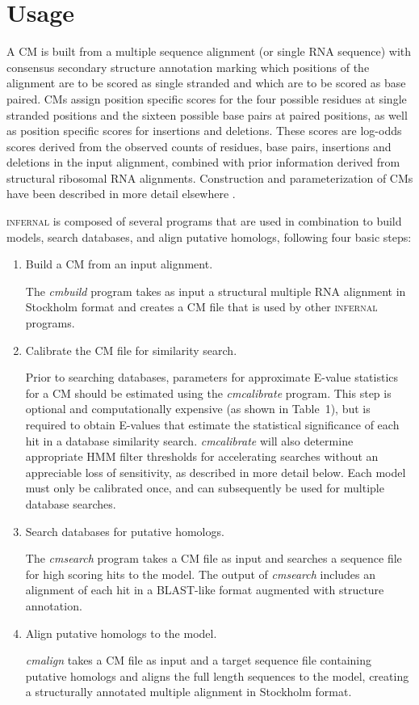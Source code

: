 
\section{Usage} 

A CM is built from a multiple sequence alignment (or single RNA
sequence) with consensus secondary structure annotation marking which
positions of the alignment are to be scored as single stranded and
which are to be scored as base paired. CMs assign position specific
scores for the four possible residues at single stranded positions and
the sixteen possible base pairs at paired positions, as well as
position specific scores for insertions and deletions. These scores
are log-odds scores derived from the observed counts of residues, base
pairs, insertions and deletions in the input alignment, combined with
prior information derived from structural ribosomal RNA
alignments. Construction and parameterization of CMs have been
described in more detail elsewhere
\citep{Eddy94,infguide03,Eddy02b,NawrockiEddy07}.

\textsc{infernal} is composed of several programs that are used in
combination to build models, search databases, and align putative
homologs, following four basic steps:

\begin{enumerate}
\item Build a CM from an input alignment.

The \emph{cmbuild} program takes as input a structural multiple
RNA alignment in Stockholm format \citep{infguide03} and creates a CM
file that is used by other \textsc{infernal} programs.

\item Calibrate the CM file for similarity search.

Prior to searching databases, parameters for approximate E-value
statistics for a CM should be estimated using the \emph{cmcalibrate}
program. This step is optional and computationally expensive (as shown
in Table~1), but is required to obtain E-values that estimate the
statistical significance of each hit in a database similarity
search. \emph{cmcalibrate} will also determine appropriate HMM filter
thresholds for accelerating searches without an appreciable loss of
sensitivity, as described in more detail below. Each model must only
be calibrated once, and can subsequently be used for multiple database
searches.

\item Search databases for putative homologs.

The \emph{cmsearch} program takes a CM file as input and searches a
sequence file for high scoring hits to the model. The output of
\emph{cmsearch} includes an alignment of each hit in a BLAST-like
format augmented with structure annotation.

\item Align putative homologs to the model.

\emph{cmalign} takes a CM file as input and a target sequence file
containing putative homologs and aligns the full length sequences to
the model, creating a structurally annotated multiple alignment in
Stockholm format.

\end{enumerate}

